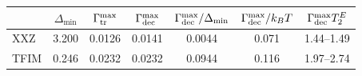 \begin{tabular}{lcccccc}
\toprule
& $\Delta_{\min}$ & $\Gamma_{\rm tr}^{\max}$ & $\Gamma_{\rm dec}^{\max}$ & $\Gamma_{\rm dec}^{\max}/\Delta_{\min}$ & $\Gamma_{\rm dec}^{\max}/k_BT$ & $\Gamma_{\rm dec}^{\max}T_2^E$ \\
\midrule
XXZ & 3.200 & 0.0126 & 0.0141 & 0.0044 & 0.071 & 1.44--1.49 \\
TFIM & 0.246 & 0.0232 & 0.0232 & 0.0944 & 0.116 & 1.97--2.74 \\
\bottomrule
\end{tabular}
